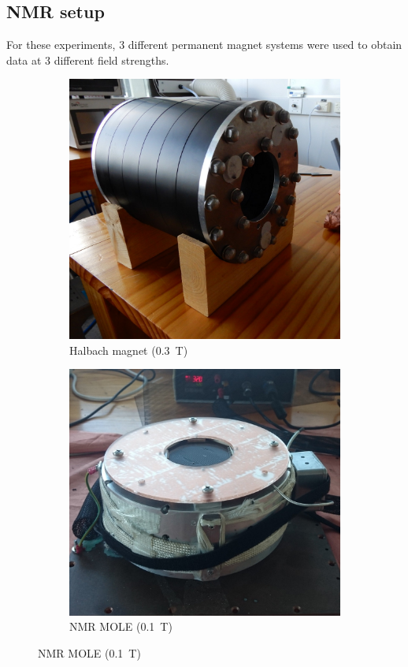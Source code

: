 \subsection{NMR setup}
For these experiments, 3 different permanent magnet systems were used to obtain data at 3 different field strengths.
\begin{figure}[t]
\centering
\begin{subfigure}[t]{0.4\textwidth}
\includegraphics[width=\textwidth]{figures/exptsetup/halbach.jpg}
\caption{Halbach magnet (\SI{0.3}{T})}
\label{fig:exptsetup-halbach}
\end{subfigure}
\hspace{0.5cm}
\begin{subfigure}[t]{0.4\textwidth}
\includegraphics[width=\textwidth]{figures/exptsetup/nmrmole.jpg}
\caption{NMR MOLE (\SI{0.1}{T})}
\label{fig:exptsetup-nmrmole}
\end{subfigure}


\end{figure}
